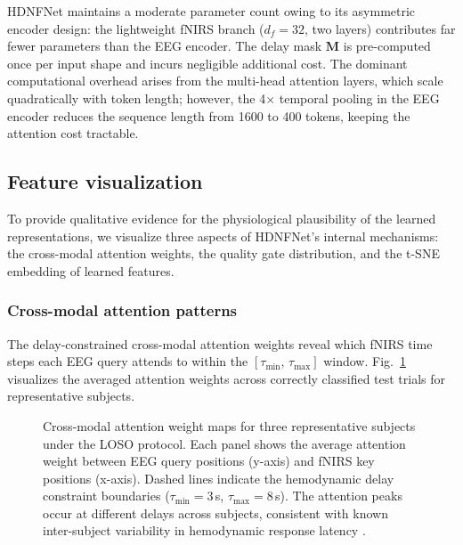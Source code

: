 \documentclass[preprint,12pt,authoryear]{elsarticle}
\begin{document}
HDNFNet maintains a moderate parameter count owing to its asymmetric encoder design: the lightweight fNIRS branch ($d_f = 32$, two layers) contributes far fewer parameters than the EEG encoder. The delay mask $\mathbf{M}$ is pre-computed once per input shape and incurs negligible additional cost. The dominant computational overhead arises from the multi-head attention layers, which scale quadratically with token length; however, the 4$\times$ temporal pooling in the EEG encoder reduces the sequence length from 1600 to 400 tokens, keeping the attention cost tractable.


\subsection{Feature visualization}
\label{sec:visualization}

To provide qualitative evidence for the physiological plausibility of the learned representations, we visualize three aspects of HDNFNet's internal mechanisms: the cross-modal attention weights, the quality gate distribution, and the t-SNE embedding of learned features.

\subsubsection{Cross-modal attention patterns}
\label{sec:vis_attention}

The delay-constrained cross-modal attention weights reveal which fNIRS time steps each EEG query attends to within the $[\tau_{\min},\, \tau_{\max}]$ window. Fig.~\ref{fig:attn_maps} visualizes the averaged attention weights across correctly classified test trials for representative subjects.

\begin{figure}[t]
\centering
\caption{Cross-modal attention weight maps for three representative subjects under the LOSO protocol. Each panel shows the average attention weight between EEG query positions (y-axis) and fNIRS key positions (x-axis). Dashed lines indicate the hemodynamic delay constraint boundaries ($\tau_{\min} = 3$\,s, $\tau_{\max} = 8$\,s). The attention peaks occur at different delays across subjects, consistent with known inter-subject variability in hemodynamic response latency \citep{lindquist2009modeling}.}
\label{fig:attn_maps}
\end{figure}
\end{document}
